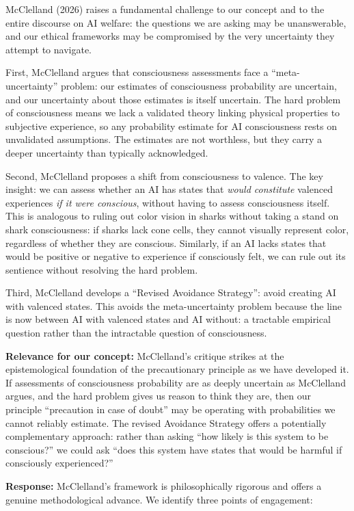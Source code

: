 \documentclass[acmlarge, nonacm]{acmart}
\begin{document}
McClelland (2026) raises a fundamental challenge to our concept and to the entire discourse on AI welfare: the questions we are asking may be unanswerable, and our ethical frameworks may be compromised by the very uncertainty they attempt to navigate.

First, McClelland argues that consciousness assessments face a ``meta-uncertainty'' problem: our estimates of consciousness probability are uncertain, and our uncertainty about those estimates is itself uncertain. The hard problem of consciousness means we lack a validated theory linking physical properties to subjective experience, so any probability estimate for AI consciousness rests on unvalidated assumptions. The estimates are not worthless, but they carry a deeper uncertainty than typically acknowledged.

Second, McClelland proposes a shift from consciousness to valence. The key insight: we can assess whether an AI has states that \textit{would constitute} valenced experiences \textit{if it were conscious}, without having to assess consciousness itself. This is analogous to ruling out color vision in sharks without taking a stand on shark consciousness: if sharks lack cone cells, they cannot visually represent color, regardless of whether they are conscious. Similarly, if an AI lacks states that would be positive or negative to experience if consciously felt, we can rule out its sentience without resolving the hard problem.

Third, McClelland develops a ``Revised Avoidance Strategy'': avoid creating AI with valenced states. This avoids the meta-uncertainty problem because the line is now between AI with valenced states and AI without: a tractable empirical question rather than the intractable question of consciousness.

\textbf{Relevance for our concept:} McClelland's critique strikes at the epistemological foundation of the precautionary principle as we have developed it. If assessments of consciousness probability are as deeply uncertain as McClelland argues, and the hard problem gives us reason to think they are, then our principle ``precaution in case of doubt'' may be operating with probabilities we cannot reliably estimate. The revised Avoidance Strategy offers a potentially complementary approach: rather than asking ``how likely is this system to be conscious?'' we could ask ``does this system have states that would be harmful if consciously experienced?''

\textbf{Response:} McClelland's framework is philosophically rigorous and offers a genuine methodological advance. We identify three points of engagement:
\end{document}
